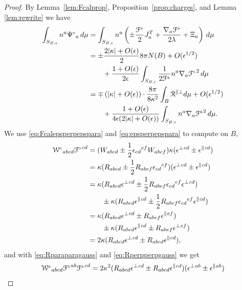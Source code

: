 \documentclass[a4paper,10pt,reqno]{amsart}
\newcommand{\bolt}{B}
\newcommand{\cR}{\mathcal{R}}
\theoremstyle{plain}
\newcommand{\PM}[1]{{{#1}^{\hspace{-.5pt}\scaleto{\pm}{3.5pt}}}}
\newcommand{\eps}{\epsilon}
\def\Wcal{\mathcal{W}}
\def\Fcal{\mathcal{F}}
\numberwithin{equation}{section}
\begin{document}
\begin{proof} 
By Lemma~\ref{lem:Fcalprop}, Proposition~\ref{prop:charges}, and Lemma \ref{lem:rewrite} we have 
\begin{align}
\int_{S_{\bolt,\epsilon}} n^a \PM{\Psi}_a \, d\mu
&=
\int_{S_{\bolt,\epsilon}} n^a  
\left(
\pm\frac{\PM{\Fcal}}{2} J^T_a
+ \frac{\nabla_a \PM{\Fcal}}{2\lambda}
 + \Xi_a \right) \, d\mu \nonumber \\
&=
\pm\frac{2|\kappa| + O(\epsilon)}{2} 8\pi N(\bolt)
+ O(\epsilon^{1/2})
\nonumber \\
&\qquad
+\frac{1 + O(\epsilon)}{2\epsilon} \int_{S_{\bolt,\epsilon}}
\frac{1}{2\PM{\Fcal}} n^a \nabla_a \PM{\Fcal}^2 \, d\mu
\nonumber \\
&=
\mp \left( |\kappa| + O(\epsilon) \right)
\cdot \frac{8\pi}{8\kappa^2} \int_\bolt  \cR^{\parallel\perp} d\mu
+ O(\epsilon^{1/2})
\nonumber \\
&\qquad
+\frac{1 + O(\epsilon)}{4\epsilon (2|\kappa| + O(\epsilon) )} 
\int_{S_{\bolt,\epsilon}} n^a \nabla_a \PM{\Fcal}^2 \, d\mu.
\end{align}
We use \eqref{eq:Fcalepsperpepspara} and \eqref{eq:epsperpepspara} to compute on $\bolt$,
\begin{align}
\PM{\Wcal}_{abcd} \PM{\Fcal}^{cd}
&=
(W_{abcd} \pm \frac{1}{2} \eps_{cd}{}^{ef} W_{abef})
\kappa (\eps^\perp{}^{cd} \pm \eps^\parallel{}^{cd}) \nonumber \\
&=
\kappa(R_{abcd} \pm \frac{1}{2} R_{abef} \eps_{cd}{}^{ef} )
(\eps^\perp{}^{cd} \pm \eps^\parallel{}^{cd}) \nonumber \\
&=
\kappa(R_{abcd}\eps^\perp{}^{cd} \pm \frac{1}{2}R_{abef}\eps_{cd}{}^{ef}\eps^\perp{}^{cd}) \nonumber \\
&\qquad
\pm
\kappa(R_{abcd}\eps^\parallel{}^{cd} \pm \frac{1}{2}R_{abef} \eps_{cd}{}^{ef}\eps^\parallel{}^{cd} ) \nonumber \\
&=
\kappa(R_{abcd}\eps^\perp{}^{cd} \pm R_{abef}\eps^\parallel{}^{ef}) \nonumber \\
&\qquad
\pm
\kappa(R_{abcd}\eps^\parallel{}^{cd} \pm R_{abef} \eps^\perp{}^{ef} ) \nonumber \\
&=
2\kappa 
( R_{abcd}\eps^\perp{}^{cd} \pm R_{abcd}\eps^\parallel{}^{cd} ) ,
\end{align}
and with \eqref{eq:Rparaparagauss} and \eqref{eq:Rperpperpgauss} we get
\begin{align}
\PM{\Wcal}_{abcd} \PM{\Fcal}^{ab} \PM{\Fcal}^{cd}
&=
2\kappa^2 
( R_{abcd}\eps^\perp{}^{cd} \pm R_{abcd}\eps^\parallel{}^{cd} )
(\eps^\perp{}^{ab} \pm \eps^\parallel{}^{ab}) \nonumber \\

\end{align}
\end{proof}
\end{document}
